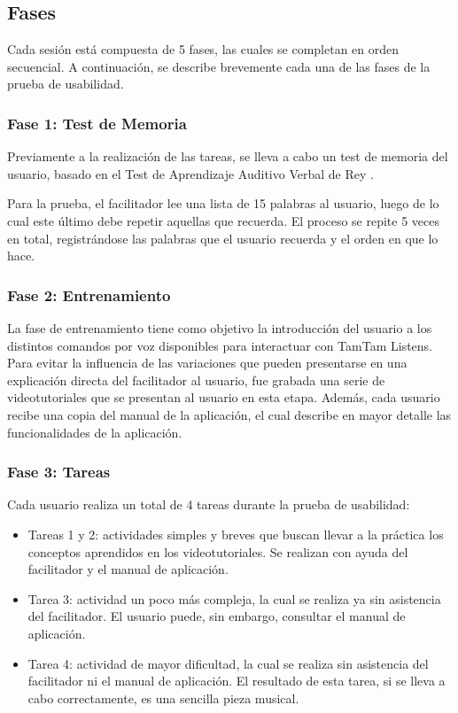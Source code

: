 \subsection{Fases}
Cada sesi\'on est\'a compuesta de 5 fases, las cuales se completan en orden secuencial.
A continuaci\'on, se describe brevemente cada una de las fases de la prueba de usabilidad.

\subsubsection{Fase 1: Test de Memoria}
Previamente a la realizaci\'on de las tareas, se lleva a cabo un test de memoria del usuario, basado en
el Test de Aprendizaje Auditivo Verbal de Rey \cite{Lopez1998}. 

Para la prueba, el facilitador lee una lista
de 15 palabras al usuario, luego de lo cual este \'ultimo debe repetir aquellas que recuerda.
El proceso se repite 5 veces en total, registr\'andose las palabras que el usuario recuerda y el orden en que
lo hace.

\subsubsection{Fase 2: Entrenamiento}
La fase de entrenamiento tiene como objetivo la introducci\'on del usuario a los distintos comandos por voz disponibles
para interactuar con TamTam Listens. 
Para evitar la influencia de las variaciones que pueden presentarse en una
explicaci\'on directa del facilitador al usuario, fue grabada una serie de videotutoriales 
que se presentan al usuario en esta etapa.
Adem\'as, cada usuario recibe una copia del manual de la aplicaci\'on, el cual describe en mayor detalle las
funcionalidades de la aplicaci\'on.

\subsubsection{Fase 3: Tareas}
Cada usuario realiza un total de 4 tareas durante la prueba de usabilidad:
	\begin{itemize}			
		\item Tareas 1 y 2: actividades simples y breves que buscan llevar a la pr\'actica los conceptos aprendidos
		en los videotutoriales. Se realizan con ayuda del facilitador y el manual de aplicaci\'on.
		\item Tarea 3: actividad un poco m\'as compleja, la cual se realiza ya sin asistencia del facilitador. El usuario puede, sin embargo, consultar el manual de aplicaci\'on.
		\item Tarea 4: actividad de mayor dificultad, la cual se realiza sin asistencia del facilitador ni el manual de
		aplicaci\'on. El resultado de esta tarea, si se lleva a cabo correctamente, es una sencilla pieza musical.
	\end{itemize}

